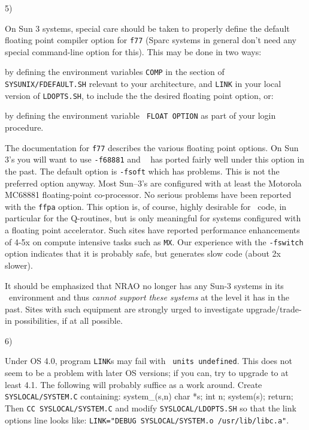 {\item {5)} {On Sun 3 systems, special care should be taken to properly
define the default floating point compiler option for {\tt f77} (Sparc
systems in general don't need any special command-line option for
this).  This may be done in two ways: {\parindent=3cm
\item\bul by defining the environment variables {\tt COMP} in the
        section of {\tt \dol SYSUNIX/FDE\-FAULT.SH} relevant to your
        architecture, and
        {\tt LINK} in your local version of {\tt LDOPTS.SH}, to include
        the the desired floating point option, or:
\item\bul by defining the environment variable {\tt
        FLOAT OPTION} as part of your login procedure.
}
The documentation for {\tt f77} describes the various floating point
options.  On Sun 3's you will want to use {\tt -f68881} and \AIPS~ has
ported fairly well under this option in the past.  The default option is
{\tt -fsoft} which has problems.  This is not the preferred option
anyway.  Most Sun--3's are configured with at least the Motorola MC68881
floating-point co-processor.  No serious problems have been reported with
the {\tt ffpa} option.  This option is, of course, highly desirable for
\AIPS\ code, in particular for the Q-routines, but is only meaningful
for systems configured with a floating point accelerator.  Such sites
have reported performance enhancements of 4-5x on compute intensive
tasks such as {\tt MX}.  Our experience with the {\tt -fswitch} option
indicates that it is probably safe, but generates slow code (about 2x
slower).

It should be emphasized that NRAO no longer has any Sun-3 systems in its
\AIPS\ environment and thus {\it cannot support these systems\/} at the
level it has in the past.  Sites with such equipment are strongly urged to
investigate upgrade/trade-in possibilities, if at all possible.  }

\item {6)} {Under OS 4.0, program {\tt LINK}s may fail with {\tt
{} units undefined}.  This does not seem to be a problem with later
OS versions; if you can, try to upgrade to at least 4.1.  The following
will probably suffice as a work around.  Create {\tt\dol SYSLOCAL/SYSTEM.C}
containing:
\fortran
          system_(s,n)
          char *s;
          int n;
          {
              system(s);
              return;
          }
\endfortran
Then {\tt CC \dol SYSLOCAL/SYSTEM.C} and modify {\tt\dol SYSLOCAL/LDOPTS.SH}
so that the link options line looks like: {\tt LINK="\dol DEBUG
\dol SYSLOCAL/SYSTEM.o /usr/lib/libc.a"}.

}}
